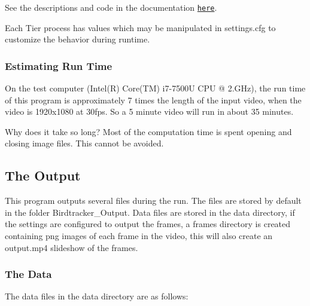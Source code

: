 See the descriptions and code in the documentation \href{https://bluenalgene.github.io/CPP_Birdtracker/html/frame__extraction_8cpp.html}{\tt here}.

Each Tier process has values which may be manipulated in {\ttfamily settings.\+cfg} to customize the behavior during runtime.

\subsubsection*{Estimating Run Time}

On the test computer (Intel(\+R) Core(\+T\+M) i7-\/7500U C\+PU @ 2.\+G\+Hz), the run time of this program is approximately 7 times the length of the input video, when the video is 1920x1080 at 30fps. So a 5 minute video will run in about 35 minutes.

Why does it take so long? Most of the computation time is spent opening and closing image files. This cannot be avoided.

\subsection*{The Output}

This program outputs several files during the run. The files are stored by default in the folder {\ttfamily Birdtracker\+\_\+\+Output}. Data files are stored in the {\ttfamily data} directory, if the settings are configured to output the frames, a {\ttfamily frames} directory is created containing {\ttfamily png} images of each frame in the video, this will also create an {\ttfamily output.\+mp4} slideshow of the frames.

\subsubsection*{The Data}

The data files in the {\ttfamily data} directory are as follows\+:


